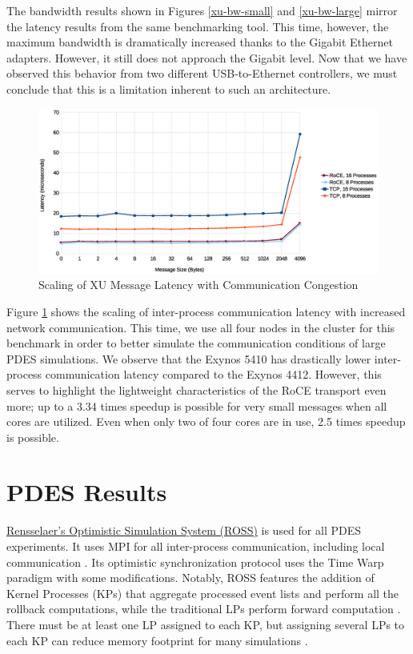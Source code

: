 \documentclass[11pt]{book}
\begin{document}
The bandwidth results shown in Figures \ref{xu-bw-small} and \ref{xu-bw-large} mirror the
latency results from the same benchmarking tool.  This time, however, the maximum
bandwidth is dramatically increased thanks to the Gigabit Ethernet adapters.  However, it
still does not approach the Gigabit level.  Now that we have observed this behavior from
two different USB-to-Ethernet controllers, we must conclude that this is a limitation
inherent to such an architecture.

\begin{figure}
\includegraphics[width=\textwidth]{xu_imb}
\caption{Scaling of XU Message Latency with Communication Congestion}
\label{xu-imb-low}
\end{figure}

Figure \ref{xu-imb-low} shows the scaling of inter-process communication latency with
increased network communication.  This time, we use all four nodes in the cluster for this
benchmark in order to better simulate the communication conditions of large PDES
simulations.  We observe that the Exynos 5410 has drastically lower inter-process
communication latency compared to the Exynos 4412.  However, this serves to highlight the
lightweight characteristics of the RoCE transport even more; up to a 3.34 times speedup is
possible for very small messages when all cores are utilized.  Even when only two of four
cores are in use, 2.5 times speedup is possible.

\section{PDES Results}\label{pdes-results}

\href{https://github.com/carothersc/ROSS}{Rensselaer's Optimistic Simulation System
  (ROSS)} is used for all PDES experiments.  It uses MPI for all inter-process
communication, including local communication \cite{carothers-02}.  Its optimistic
synchronization protocol uses the Time Warp paradigm with some modifications.  Notably,
ROSS features the addition of Kernel Processes (KPs) that aggregate processed event lists
and perform all the rollback computations, while the traditional LPs perform forward
computation \cite{carothers-02}.  There must be at least one LP assigned to each KP, but
assigning several LPs to each KP can reduce memory footprint for many simulations
\cite{carothers-02}.
\end{document}
